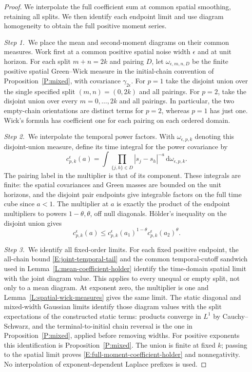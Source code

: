 \documentclass[12pt,oneside,openany]{book}
\numberwithin{equation}{section}
\theoremstyle{nogostyle}
\theoremstyle{definition}
\newcommand{\ud}{\,\mathrm{d}}
\begin{document}
\begin{proof}
  We interpolate the full coefficient sum at common spatial smoothing,
  retaining all splits. We then identify each endpoint limit and use diagram
  homogeneity to obtain the full positive moment series.


  \medskip
  \noindent\textit{Step 1.~}We place the mean and second-moment diagrams on
  their common measures.
  Work first at a common positive spatial noise width \(\epsilon\) and at unit
  horizon. For each split \(m+n=2k\) and pairing \(D\), let
  \(\omega_{\epsilon,m,n,D}\) be the finite positive spatial Green--Wick measure
  in the initial-chain convention of Proposition~\ref{P:mixed}, with covariance
  \(\gamma_{2\epsilon}\). For \(p=1\) take the disjoint union over the single
  specified split \((m,n)=(0,2k)\) and all pairings. For \(p=2\), take the
  disjoint union over every \(m=0,\ldots,2k\) and all pairings. In particular,
  the two empty-chain orientations are distinct terms for \(p=2\), whereas
  \(p=1\) has just one. Wick's formula has coefficient one for each pairing on
  each ordered domain.


  \medskip
  \noindent\textit{Step 2.~}We interpolate the temporal power factors.
  With \(\omega_{\epsilon,p,k}\) denoting this disjoint-union measure, define
  its time integral for the power covariance by
  \[
    c_{p,k}^{\epsilon}(a)=
    \int \prod_{\{j,h\}\in D}|s_j-s_h|^{-a}
    \ud\omega_{\epsilon,p,k}.
  \]
  The pairing label in the multiplier is that of its component. These integrals
  are finite: the spatial covariances and Green masses are bounded on the unit
  horizons, and the disjoint pair endpoints give integrable factors on the full
  time cube since \(a<1\). The multiplier at \(a\) is exactly the product of the
  endpoint multipliers to powers \(1-\theta,\theta\), off null diagonals.
  Hölder's inequality on the disjoint union gives
  \[
    c_{p,k}^{\epsilon}(a)\le
    c_{p,k}^{\epsilon}(a_1)^{1-\theta}
    c_{p,k}^{\epsilon}(a_2)^\theta.
  \]


  \medskip
  \noindent\textit{Step 3.~}We identify all fixed-order limits.
  For each fixed positive endpoint, the all-chain bound
  \eqref{E:joint-temporal-tail} and the common temporal-cutoff sandwich used in
  Lemma~\ref{L:mean-coefficient-holder} identify the time-domain spatial limit
  with the joint diagram value. This applies to every unequal or empty split,
  not only to a mean diagram. At exponent zero, the multiplier is one and
  Lemma~\ref{L:spatial-wick-measures} gives the same limit. The static diagonal
  and mixed-width Gaussian limits identify those diagram values with the split
  expectations of the constructed static terms: products converge in \(L^1\) by
  Cauchy--Schwarz, and the terminal-to-initial chain reversal is the one in
  Proposition~\ref{P:mixed}, applied before removing widths. For positive
  exponents this identification is Proposition~\ref{P:mixed}. The union is
  finite at fixed \(k\); passing to the spatial limit proves
  \eqref{E:full-moment-coefficient-holder} and nonnegativity. No interpolation
  of exponent-dependent Laplace prefixes is used.



\end{proof}
\end{document}
